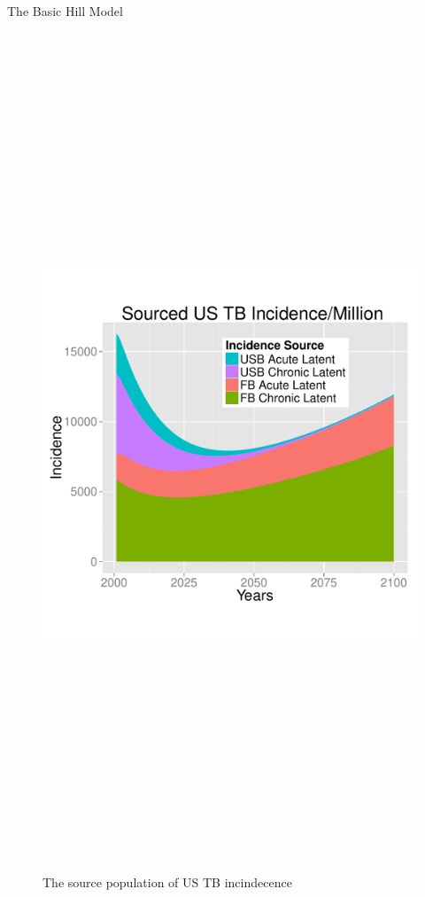 \documentclass[final]{beamer}
\begin{document}
\begin{frame}
\begin{columns}
\begin{column}{.3\textwidth}
\begin{block}{The Basic Hill Model}
\begin{block}{}
\begin{figure}[h]
\begin{center}
              \includegraphics[height=25cm,width=\textwidth]{incPlotSourced2}
            \end{center}
            \caption{The source population of US TB incindecence}
            \label{fig:incPlotSourced}
          \end{figure}
          \vspace{-1em}
          \begin{figure}[h]

\end{figure}
\end{block}
\end{block}
\end{column}
\end{columns}
\end{frame}
\end{document}
